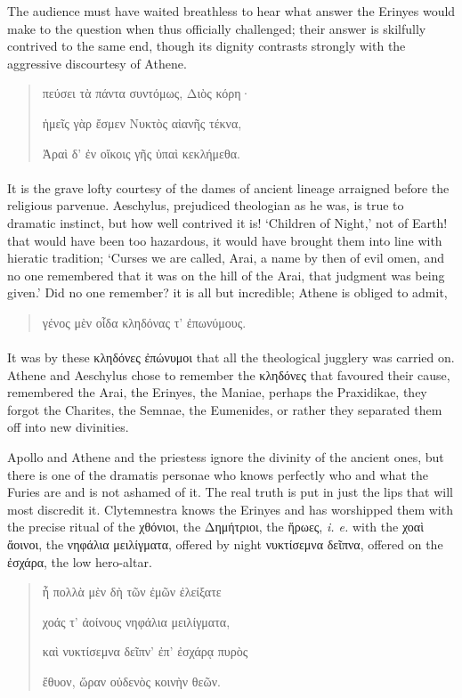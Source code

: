 \documentclass[a4paper, 11pt, oneside, polutonikogreek, english]{article}
\begin{document}
The audience must have waited breathless to hear what answer the Erinyes would make to the question when thus officially challenged; their answer is skilfully contrived to the same end, though its dignity contrasts strongly with the aggressive discourtesy of Athene.
\begin{quotation}
πεύσει τὰ πάντα συντόμως, Διὸς κόρη·

ἡμεῖς γὰρ ἔσμεν Νυκτὸς αἰανῆς τέκνα,

Ἀραὶ δ' ἐν οἴκοις γῆς ὑπαὶ κεκλήμεθα.
\end{quotation}
\paragraph{}
It is the grave lofty courtesy of the dames of ancient lineage arraigned before the religious parvenue. Aeschylus, prejudiced theologian as he was, is true to dramatic instinct, but how well contrived it is! `Children of Night,' not of Earth! that would have been too hazardous, it would have brought them into line with hieratic tradition; `Curses we are called, Arai, a name by then of evil omen, and no one remembered that it was on the hill of the Arai, that judgment was being given.' Did no one remember? it is all but incredible; Athene is obliged to admit,
\begin{quotation}
γένος μὲν οἷδα κληδόνας τ' ἐπωνύμους.
\end{quotation}
\paragraph{}
It was by these κληδόνες ἐπώνυμοι that all the theological jugglery was carried on. Athene and Aeschylus chose to remember the κληδόνες that favoured their cause, remembered the Arai, the Erinyes, the Maniae, perhaps the Praxidikae, they forgot the Charites, the Semnae, the Eumenides, or rather they separated them off into new divinities.

Apollo and Athene and the priestess ignore the divinity of the ancient ones, but there is one of the dramatis personae who knows perfectly who and what the Furies are and is not ashamed of it. The real truth is put in just the lips that will most discredit it. Clytemnestra knows the Erinyes and has worshipped them with the precise ritual of the χθόνιοι, the Δημήτριοι, the ἥρωες, \emph{i. e.} with the χοαὶ ἄοινοι, the νηφάλια μειλίγματα, offered by night νυκτίσεμνα δεῖπνα, offered on the ἐσχάρα, the low hero-altar.
\begin{quotation}
ἦ πολλὰ μὲν δὴ τῶν ἐμῶν ἐλείξατε

χοάς τ' ἀοίνους νηφάλια μειλίγματα,

καὶ νυκτίσεμνα δεῖπν' ἐπ' ἐσχάρᾳ πυρὸς

ἔθυον, ὥραν οὐδενὸς κοινὴν θεῶν.
\end{quotation}
\end{document}
